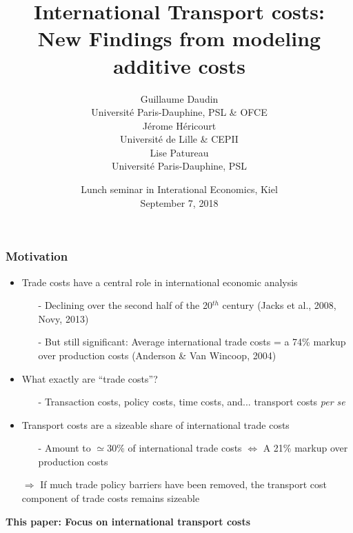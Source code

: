 \documentclass[10 pt,Helvetica, french]{beamer}
\date[September 2018]{Lunch seminar in Interational Economics, Kiel \\ September 7, 2018}
\title[New Findings from modeling additive costs]{International Transport costs:\\New Findings from modeling additive costs}
\author[Daudin et al.]{Guillaume Daudin\\
{\footnotesize Universit\'{e} Paris-Dauphine, PSL \& OFCE }\\ \smallskip
J\'{e}rome H\'{e}ricourt \\
{\footnotesize Universit\'{e} de Lille \& CEPII }\\  \smallskip
Lise Patureau \\
{\footnotesize  Universit\'{e} Paris-Dauphine, PSL}}
\begin{document}
\begin{frame}[plain]
\titlepage
\end{frame}


\begin{frame}
\frametitle{Motivation}
\begin{itemize}
\item Trade costs have a central role in international economic analysis \vspace{0.1cm}
\begin{itemize}
\item[-] Declining over the second half of the 20$^{th}$ century (Jacks et al., 2008, Novy, 2013) \vspace{0.1cm}
\item[-] But still significant: Average international trade costs = a 74\% markup over production costs (Anderson \& Van Wincoop, 2004)

\pause
\end{itemize}
\item What exactly are ``trade costs''?  \vspace{0.1cm}
\begin{itemize}
\item[-] Transaction costs, policy costs, time costs, and... transport costs \textit{per se}
\end{itemize}
\pause
\item Transport costs are a sizeable share of international trade costs \vspace{0.1cm}
\begin{itemize}
\item[-]  Amount to $\simeq 30\%$ of international trade costs  $\Leftrightarrow$ A 21\% markup over production costs  \vspace{0.1cm}
\end{itemize}
\item[$\Rightarrow$] If much trade policy barriers have been removed, the transport cost component of trade costs remains sizeable \vspace{0.1cm}
\end{itemize}
\textbf{This paper: Focus on international transport costs}

\end{frame}
\end{document}
